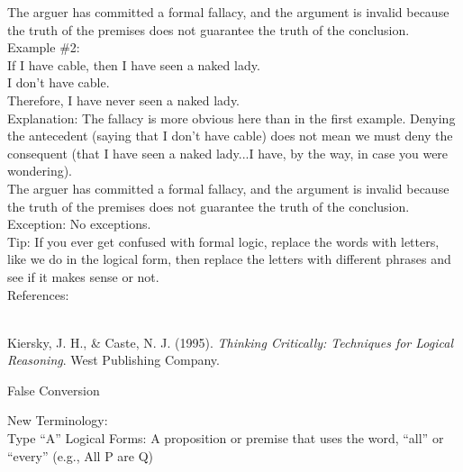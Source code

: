 \documentclass[a4paper,12pt,single,pdftex]{scrbook}
\begin{document}
    
      The arguer has committed a formal fallacy, and the argument is invalid because the truth of the premises does not guarantee the truth of the conclusion.
    \\

    
      Example \#2:
    \\

    
      If I have cable, then I have seen a naked lady.
    \\

    
      I don’t have cable.
    \\

    
      Therefore, I have never seen a naked lady.
    \\

    
      Explanation: The fallacy is more obvious here than in the first example. Denying the antecedent (saying that I don’t have cable) does not mean we must deny the consequent (that I have seen a naked lady...I have, by the way, in case you were wondering).
    \\

    
      The arguer has committed a formal fallacy, and the argument is invalid because the truth of the premises does not guarantee the truth of the conclusion.
    \\

    
      Exception: No exceptions.
    \\

    
      Tip: If you ever get confused with formal logic, replace the words with letters, like we do in the logical form, then replace the letters with different phrases and see if it makes sense or not.
    \\

    References:

    
      
        
      \\

      
        
          Kiersky, J. H., \& Caste, N. J. (1995). {\it Thinking Critically: Techniques for Logical Reasoning}. West Publishing Company.
        
      
    
  

False Conversion
    
      New Terminology:
    \\

    
      Type “A” Logical Forms: A proposition or premise that uses the word, “all” or “every” (e.g., All P are Q)
    \\
\end{document}
